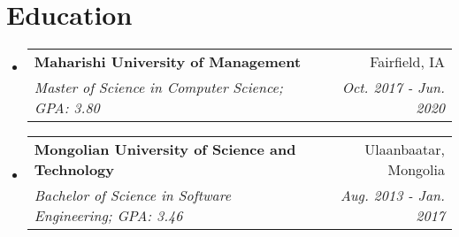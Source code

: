 \documentclass[letterpaper,11pt]{article}
\makeatletter
\newcommand{\resumeItem}[2]{
  \item\small{
    \textbf{#1}{: #2 \vspace{-2pt}}
  }
}
\newcommand{\resumeSubheading}[4]{
  \vspace{-1pt}\item
    \begin{tabular*}{0.97\textwidth}{l@{\extracolsep{\fill}}r}
      \textbf{#1} & #2 \\
      \textit{\small#3} & \textit{\small #4} \\
    \end{tabular*}\vspace{-5pt}
}
\newcommand{\resumeSubItem}[2]{\resumeItem{#1}{#2}\vspace{-4pt}}
\newcommand{\resumeSubHeadingListStart}{\begin{itemize}[leftmargin=*]}
\newcommand{\resumeSubHeadingListEnd}{\end{itemize}}
\makeatother
\begin{document}


\section{Education}
  \resumeSubHeadingListStart
    \resumeSubheading
      {Maharishi University of Management}{Fairfield, IA}
      {Master of Science in Computer Science;  GPA: 3.80}{Oct. 2017 - Jun. 2020}

    \resumeSubheading
      {Mongolian University of Science and Technology}{Ulaanbaatar, Mongolia}
      {Bachelor of Science in Software Engineering;  GPA: 3.46}{Aug. 2013 - Jan. 2017}
  \resumeSubHeadingListEnd


\end{document}
